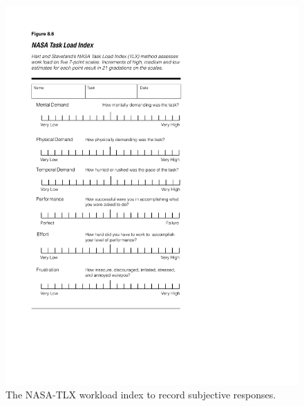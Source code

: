 \begin{figure}[t]
\centering
\includegraphics[width=\linewidth]{gfx/NASA_TXL.pdf}
\caption{The NASA-TLX workload index to record subjective responses.}
\label{fig:nasatxl}
\end{figure}


